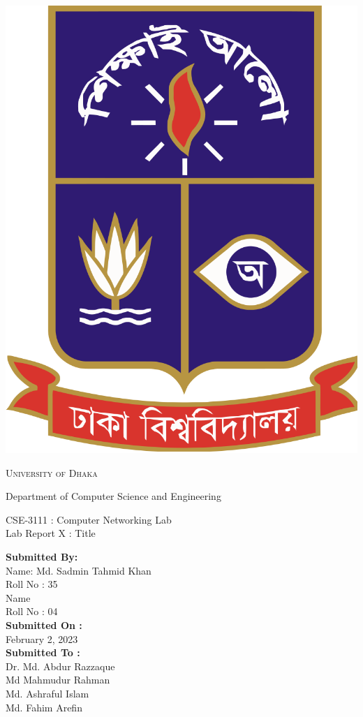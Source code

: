 \documentclass[11pt]{article}
\begin{document}
\begin{titlepage}
	\begin{center}
    	\includegraphics[scale=0.10]{du.png}\par
		\begin{Huge}
			\textsc{University of Dhaka}\par
		\end{Huge}
		\begin{Large}
			Department of Computer Science and Engineering\par \vspace{1cm}
			CSE-3111 : Computer Networking Lab \\[12pt]	
			Lab Report X : Title
		\end{Large}
	\end{center}  	
	\begin{large}
		\textbf{Submitted By:\\[12pt]}
			Name: Md. Sadmin Tahmid Khan\\[8pt]
			Roll No : 35\\[12pt]
			Name\\[8pt]
			Roll No : 04\\[12pt]
		\textbf{Submitted On : \\[12pt]}
			February 2, 2023\\[20pt]
		\textbf{Submitted To :\\[12pt]}
			Dr. Md. Abdur Razzaque\\[12pt]
                Md Mahmudur Rahman\\[12pt]
                Md. Ashraful Islam\\[12pt]
                Md. Fahim Arefin
	\end{large}
\end{titlepage}
\end{document}
